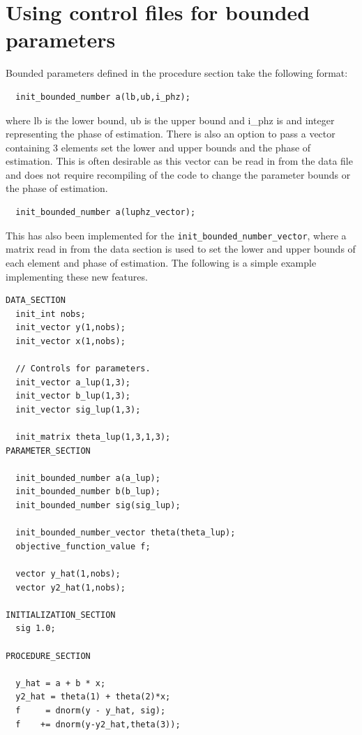 \documentclass{admbmanual}
\begin{document}
\section{Using control files for bounded parameters}
Bounded parameters defined in the procedure section take the following format:
\begin{lstlisting}
  init_bounded_number a(lb,ub,i_phz);
\end{lstlisting}
where lb is the lower bound, ub is the upper bound and i\_phz is and integer representing 
the phase of estimation.  There is also an option to pass a vector containing 3 elements
set the lower and upper bounds and the phase of estimation.  This is often desirable as this
vector can be read in from the data file and does not require recompiling of the code to change
the parameter bounds or the phase of estimation.

\begin{lstlisting}
  init_bounded_number a(luphz_vector);
\end{lstlisting}

This has also been implemented for the \texttt{init\_bounded\_number\_vector}, where a matrix 
read in from the data section is used to set the lower and upper bounds of each element and 
phase of estimation.  The  following is a simple example implementing these new features.

\begin{lstlisting}
DATA_SECTION
  init_int nobs;
  init_vector y(1,nobs);
  init_vector x(1,nobs);

  // Controls for parameters.
  init_vector a_lup(1,3);
  init_vector b_lup(1,3);
  init_vector sig_lup(1,3);

  init_matrix theta_lup(1,3,1,3);
PARAMETER_SECTION

  init_bounded_number a(a_lup);
  init_bounded_number b(b_lup);
  init_bounded_number sig(sig_lup);

  init_bounded_number_vector theta(theta_lup);
  objective_function_value f;

  vector y_hat(1,nobs);
  vector y2_hat(1,nobs);

INITIALIZATION_SECTION
  sig 1.0;

PROCEDURE_SECTION
  
  y_hat = a + b * x;
  y2_hat = theta(1) + theta(2)*x;
  f     = dnorm(y - y_hat, sig);
  f    += dnorm(y-y2_hat,theta(3));
\end{lstlisting} 
\end{document}
